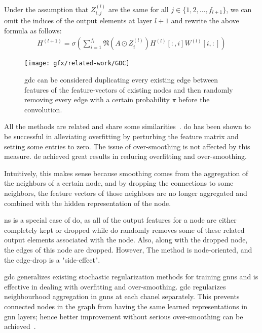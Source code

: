 Under the assumption that $Z_{i,j}^{(l)}$ are the same for all $j \in \{1,2,\dots, f_{l+1}\}$, we can omit the indices of the output elements at layer $l+1$ and rewrite the above formula as follows:
\begin{align}
    H^{(l+1)} = \sigma(\sum_{i= 1}^{f_{l}}\mathfrak{N}(A \odot Z_{i}^{(l)})H^{(l)}[:,i] W^{(l)}[i,:])
    \label{eq:related:gdc-relaxed}
\end{align}
\begin{figure}[H]
    \centering
    \texttt{[image: gfx/related-work/GDC]}
    \caption{\acf{gdc} can be considered duplicating every existing edge between features of the feature-vectors of existing nodes and then randomly removing every edge with a certain probability $\pi$ before the convolution.}\label{fig:related:GraphDropConnect}
\end{figure}

All the methods are related and share some similarities~\cite{Rong2020}.
\Acf{do} has been shown to be successful in alleviating overfitting by perturbing the feature matrix and setting some entries to zero.
The issue of over-smoothing is not affected by this measure.
\Acf{de} achieved great results in reducing overfitting and over-smoothing.

Intuitively, this makes sense because smoothing comes from the aggregation of the neighbors of a certain node, and by dropping the connections to some neighbors, the feature vectors of those neighbors are no longer aggregated and combined with the hidden representation of the node.

\Acf{ns} is a special case of \acf{do}, as all of the output features for a node are either completely kept or dropped while \ac{do} randomly removes some of these related output elements associated with the node.
Also, along with the dropped node, the edges of this node are dropped.
However, The method is node-oriented, and the edge-drop is a "side-effect".

\Acf{gdc} generalizes existing stochastic regularization methods for training \acp{gnn} and is effective in dealing with overfitting and over-smoothing.
\Ac{gdc} regularizes neighbourhood aggregation in \acp{gnn} at each chanel separately.
This prevents connected nodes in the graph from having the same learned representations in \ac{gnn} layers;
hence better improvement without serious over-smoothing can be achieved~\cite{Hasanzadeh2020}.

